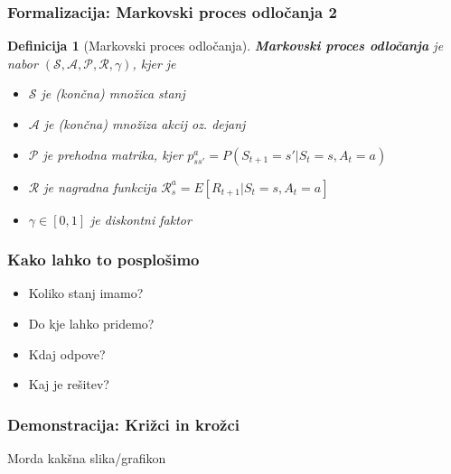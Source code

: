 \documentclass{beamer}    %
\newtheorem{definicija}[izrek]{Definicija}
\begin{document}
\begin{frame}
    \frametitle{Formalizacija: Markovski proces odločanja 2}
    \begin{definicija}[Markovski proces odločanja]
        \textbf{Markovski proces odločanja} je nabor 
        $(\mathcal{S}, \mathcal{A}, \mathcal{P}, \mathcal{R}, \gamma)$, kjer je
        \begin{itemize}
            \item $\mathcal{S}$ je (končna) množica stanj
            \item $\mathcal{A}$ je (končna) množiza akcij oz. dejanj
            \item $\mathcal{P}$ je prehodna matrika, kjer $p_{ss'}^a = P(S_{t+1} = s' | S_{t} = s, A_t = a)$
            \item $\mathcal{R}$ je nagradna funkcija $\mathcal{R}_s^a = E[R_{t+1} | S_{t} = s, A_t = a]$
            \item $\gamma \in [0, 1]$ je diskontni faktor
        \end{itemize}
    \end{definicija}
\end{frame}


\begin{frame}
    \frametitle{Kako lahko to posplošimo}
    \begin{itemize}
        \item Koliko stanj imamo?
        \item Do kje lahko pridemo?
        \item Kdaj odpove?
        \item Kaj je rešitev?
    \end{itemize}
\end{frame}


%    


\begin{frame}
    \frametitle{Demonstracija: Križci in krožci}
    Morda kakšna slika/grafikon
\end{frame}
\end{document}

